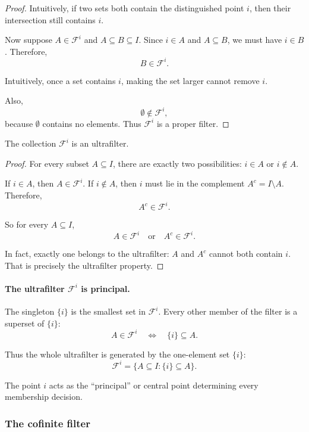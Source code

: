 {\begin{proof}
Intuitively, if two sets both contain the distinguished point \(i\), then
their intersection still contains \(i\).

Now suppose \(A \in \mathcal{F}^i\) and \(A \subseteq B \subseteq I\).
Since \(i \in A\) and \(A \subseteq B\), we must have \(i \in B\).
Therefore,
\[
B \in \mathcal{F}^i.
\]

Intuitively, once a set contains \(i\), making the set larger cannot remove
\(i\).

Also,
\[
\emptyset \notin \mathcal{F}^i,
\]
because \(\emptyset\) contains no elements. Thus \(\mathcal{F}^i\) is a
proper filter.
\end{proof}

\begin{prop}
The collection \(\mathcal{F}^i\) is an ultrafilter.
\end{prop}

\begin{proof}
For every subset \(A \subseteq I\), there are exactly two possibilities:
\(i \in A\) or \(i \notin A\).

If \(i \in A\), then \(A \in \mathcal{F}^i\). If \(i \notin A\), then
\(i\) must lie in the complement \(A^c = I \setminus A\). Therefore,
\[
A^c \in \mathcal{F}^i.
\]

So for every \(A \subseteq I\),
\[
A \in \mathcal{F}^i
\quad \text{or} \quad
A^c \in \mathcal{F}^i.
\]

In fact, exactly one belongs to the ultrafilter: \(A\) and \(A^c\) cannot
both contain \(i\). That is precisely the ultrafilter property.
\end{proof}

\paragraph{The ultrafilter \(\mathcal{F}^i\) is principal.}
The singleton \(\{i\}\) is the smallest set in \(\mathcal{F}^i\). Every
other member of the filter is a superset of \(\{i\}\):
\[
A \in \mathcal{F}^i
\quad \Longleftrightarrow \quad
\{i\} \subseteq A.
\]

Thus the whole ultrafilter is generated by the one-element set \(\{i\}\):
\[
\mathcal{F}^i = \{A \subseteq I : \{i\} \subseteq A\}.
\]

The point \(i\) acts as the ``principal'' or central point determining every
membership decision.

\subsubsection{The cofinite filter}

}
